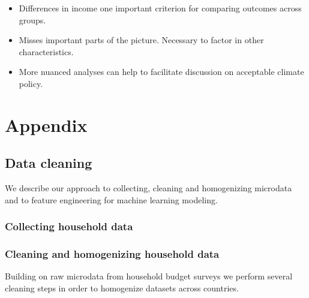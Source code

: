 \documentclass[12pt, a4paper]{article}
\begin{document}
\begin{itemize}
 \item Differences in income one important criterion for comparing outcomes across groups.
 \item Misses important parts of the picture. Necessary to factor in other characteristics.
 \item More nuanced analyses can help to facilitate discussion on acceptable climate policy.
\end{itemize}

\clearpage

\printbibliography

\clearpage

\appendix

\section{Appendix} \label{sec:appendix}

\subsection{Data cleaning} \label{sec:cleaning}

We describe our approach to collecting, cleaning and homogenizing microdata and to feature engineering for machine learning modeling.

\subsubsection{Collecting household data}



\subsubsection{Cleaning and homogenizing household data}

Building on raw microdata from household budget surveys we perform several cleaning steps in order to homogenize datasets across countries.
\end{document}
